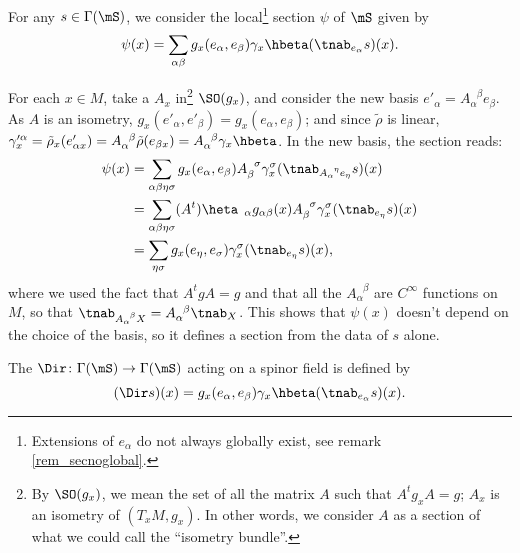 For any $s\in\Gamma(\mS)$, we consider the local\footnote{Extensions of $e_{\alpha}$ do not always globally exist, see remark \ref{rem_secnoglobal}.} section $\psi$ of $\mS$ given by
\[
    \psi(x)=
   \sum_{\alpha\beta}g_x(e_{\alpha},e_{\beta})\gamma_x\hbeta(\tnab_{e_{\alpha}}s)(x).
\]

For each $x\in M$, take a $A_x$ in\footnote{By $\SO(g_x)$, we mean the set of all the matrix $A$ such that $A^tg_xA=g$; $A_x$ is an isometry of $(T_xM,g_x)$. In other words, we consider $A$ as a section of what we could call the ``isometry bundle''.} $\SO(g_x)$, and consider the new basis $e'_{\alpha}=A_{\alpha}^{\phantom{\alpha}\beta}e_{\beta}$. As $A$ is an isometry, $g_x(e'_{\alpha},e'_{\beta})=g_x(e_{\alpha},e_{\beta})$; and since $\tilde\rho$ is linear, $\gamma_x'^{\alpha}=\tilde\rho_x(e'_{\alpha x})=A_{\alpha}^{\phantom{\alpha}\beta}\tilde\rho(e_{\beta x})=A_{\alpha}^{\phantom{\alpha}\beta}\gamma_x\hbeta$. In the new basis, the section reads:
\begin{equation}
\begin{split}
   \psi(x)&=\sum_{\alpha\beta\eta\sigma}g_x(e_{\alpha},e_{\beta})
                A_{\beta}^{\phantom{\beta}\sigma}\gamma_x^{\sigma}
                (\tnab_{A_{\alpha}^{\phantom{\alpha}\eta}e_{\eta}}s)(x)\\
          &=\sum_{\alpha\beta\eta\sigma}(A^t)\heta_{\phantom{\eta}\alpha}
                  g_{\alpha\beta}(x)A_{\beta}^{\phantom{\beta}\sigma}
                  \gamma_x^{\sigma}(\tnab_{e_{\eta}}s)(x)\\
          &=\sum_{\eta\sigma}g_x(e_{\eta},e_{\sigma})\gamma_x^{\sigma}(\tnab_{e_{\eta}}s)(x),
\end{split}
\end{equation}
where we used the fact that $A^tgA=g$ and that all the $A_{\alpha}^{\phantom{\alpha}\beta}$ are $C^{\infty}$ functions on $M$, so that
$\tnab_{A_{\alpha}^{\phantom{\alpha}\beta}X}=A_{\alpha}^{\phantom{\alpha}\beta}\tnab_X$.  This shows that $\psi(x)$ doesn't depend on the choice of the basis, so it defines a section from the data of $s$ alone.


The  $\Dir\colon \Gamma(\mS)\to \Gamma(\mS)$ acting on a spinor field is defined by 
\begin{equation}\label{dirac}
(\Dir s)(x)=g_x(e_{\alpha},e_{\beta})\gamma_x\hbeta(\tnab_{e_{\alpha}}s)(x).
\end{equation}


